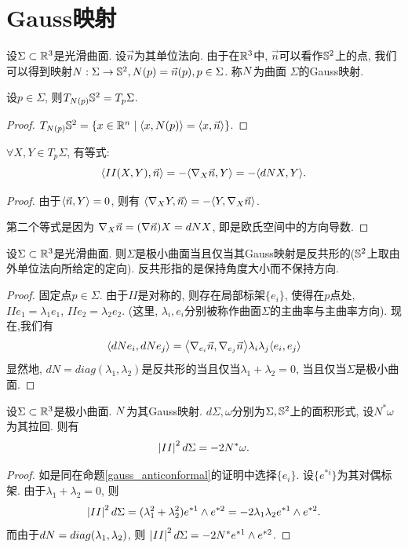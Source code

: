 \section{Gauss映射}
设$\Sigma \subset \R^3$是光滑曲面. 设$\vec{n}$为其单位法向. 由于在$\R^3$中, $\vec{n}$可以看作$\S^2$上的点, 我们可以得到映射$\N:\Sigma \to  \S^2, \N(p)=\vec{n}(p), p \in \Sigma$. 称$\N$为曲面 $\Sigma$的Gauss映射.
\begin{proposition}
    设$p \in \Sigma$, 则$T_{\N(p)}\S^2= T_p\Sigma$.
\end{proposition}
\begin{proof}
    $T_{\N(p)}\S^2=\{x\in \R^n\mid \inner{x}{\N(p)}=\inner{x}{\vec{n}}\}$.
\end{proof}
\begin{proposition}
    $\forall X, Y \in T_p\Sigma$, 有等式: 
    \begin{equation}
        \inner{II(X,Y)}{\vec{n}}=-\inner{\nabla_X\vec{n}}{Y}=-\inner{d\N X}{Y}.
    \end{equation}
\end{proposition}
\begin{proof}
    由于$\inner{\vec{n}}{Y}=0$, 则有 $\inner{\nabla_XY}{\vec{n}}=-\inner{Y}{\nabla_X\vec{n}}$. 
    \par 第二个等式是因为 $\nabla_X\vec{n}=(\nabla \vec{n})X=d\N X$, 即是欧氏空间中的方向导数.
\end{proof}
\begin{proposition} \label{gauss_anticonformal}
    设$\Sigma \subset \R^3$是光滑曲面. 则$\Sigma$是极小曲面当且仅当其Gauss映射是反共形的($\S^2$上取由外单位法向所给定的定向). 反共形指的是保持角度大小而不保持方向.
\end{proposition}
\begin{proof}
    固定点$p \in \Sigma$. 由于$II$是对称的, 则存在局部标架$\{e_i\}$, 使得在$p$点处, $II e_1=\lambda_1 e_1$, $II e_2=\lambda_2 e_2$. (这里, $\lambda_i,e_i$分别被称作曲面$\Sigma$的主曲率与主曲率方向). 现在,我们有
    \begin{equation}
        \inner{d\N e_i}{d\N e_j}= \inner{\nabla_{e_i}\vec{n}}{\nabla_{e_j}\vec{n}} \lambda_i\lambda_j\inner{e_i}{e_j}
    \end{equation}
    显然地,  $dN=diag(\lambda_1,\lambda_2)$是反共形的当且仅当$\lambda_1+\lambda_2=0$, 当且仅当$\Sigma$是极小曲面.
\end{proof}
\begin{proposition}
    设$\Sigma \subset \R^3$是极小曲面. $\N$为其Gauss映射. $d\Sigma, \omega$分别为$\Sigma, \S^2$上的面积形式, 设$N^*\omega$为其拉回. 则有
    \begin{equation}
        \abs{II}^2d\Sigma= -2N^*\omega.
    \end{equation}
\end{proposition}
\begin{proof}
    如是同在命题\eqref{gauss_anticonformal}的证明中选择$\{e_i\}$. 设$\{e^{*i}\}$为其对偶标架. 由于$\lambda_1+\lambda_2=0$, 则
    \begin{equation}
        \abs{II}^2d\Sigma=(\lambda_1^2+\lambda_2^2)e^{*1}\wedge e^{*2}=-2\lambda_1\lambda_2 e^{*1}\wedge e^{*2}.
    \end{equation}
    而由于$d\N=diag(\lambda_1,\lambda_2)$, 则 $\abs{II}^2d\Sigma=-2N^* e^{*1} \wedge e^{*2}$.
\end{proof}
